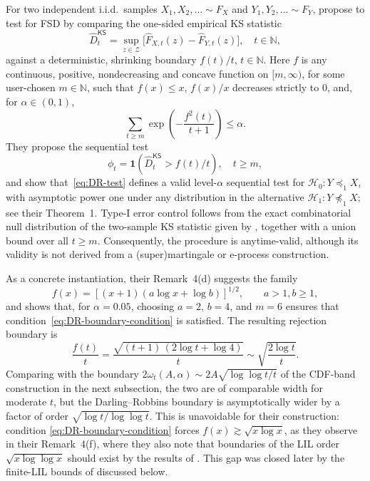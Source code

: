 \documentclass[12pt,twoside]{article}
\theoremstyle{plain}
\theoremstyle{definition}
\theoremstyle{remark}
\newcommand{\N}{\mathbb{N}}
\newcommand{\calH}{\mathcal{H}}
\begin{document}
For two independent i.i.d.\ samples
$X_1, X_2, \dots \sim F_X$ and $Y_1, Y_2, \dots \sim F_Y$, \citet{darling1968some} propose to test for FSD by
comparing the one-sided empirical KS statistic
\begin{equation*}
    \hat{D}^\textsf{KS}_t = \sup_{z \in \mathcal{Z}}
  \big[\widehat{F}_{X,t}(z) - \widehat{F}_{Y,t}(z)\big], \quad t\in \N,
\end{equation*}
against a deterministic, shrinking boundary $f(t)/t$, $t\in \N$. Here $f$ is any
continuous, positive, nondecreasing and concave function on $[m,\infty)$, for
some user-chosen $m \in \mathbb{N}$, such that $f(x) \le x$, $f(x)/x$
decreases strictly to $0$, and, for $\alpha\in (0,1)$,
\begin{equation} \label{eq:DR-boundary-condition}
  \sum_{t \ge m} \exp\left(-\frac{f^2(t)}{t+1}\right) \le \alpha .
\end{equation}
They propose the sequential test
\begin{equation}
  \phi_t = \mathbf{1}\!\left(\hat{D}^\textsf{KS}_t > f(t)/t\right), \quad t \ge m,
  \label{eq:DR-test}
\end{equation}
and show that~\eqref{eq:DR-test} defines a valid level-$\alpha$ sequential test for $\calH_0 : Y \preceq_1 X$, with asymptotic power one under any distribution in the alternative $\calH_1 : Y \not\preceq_1 X$; see their Theorem~1.
Type-I error control follows from the exact combinatorial null distribution of the two-sample KS statistic given by \citet{GnedenkoKorolyuk1951}, together with a union bound over all $t \geq m$. Consequently, the procedure is anytime-valid, although its validity is not derived from a (super)martingale or e-process construction.

As a concrete instantiation, their Remark~4(d) suggests the family
\begin{equation*}
f(x) = [(x+1)(a \log x + \log b)]^{1/2},
\qquad a > 1, b \ge 1,
\end{equation*}
and shows that, for $\alpha = 0.05$, choosing $a = 2$, $b = 4$, and $m = 6$ ensures that condition~\eqref{eq:DR-boundary-condition} is satisfied. The resulting rejection boundary is
\begin{equation*}
     \frac{f(t)}{t}
  = \frac{\sqrt{(t+1)\,(2\log t + \log 4)}}{t}
  \sim \sqrt{\frac{2\log t}{t}} .
\end{equation*}
Comparing with the boundary $2\omega_t(A,\alpha) \sim
2A\sqrt{\log\log t / t}$ of the CDF-band construction in the next subsection, the two are of comparable width for moderate $t$, 
but the Darling--Robbins boundary is asymptotically wider by a factor of order
$\sqrt{\log t / \log\log t}$. This is unavoidable for their construction:
condition \eqref{eq:DR-boundary-condition} forces $f(x) \gtrsim \sqrt{x\log x}$,
as they observe in their Remark~4(f), where they also note that boundaries of
the LIL order $\sqrt{x \log\log x}$ should exist by the results of
\citet{chung1949estimate}. This gap was closed later by the finite-LIL bounds of \citet{howard2022sequential} discussed
below. 
\end{document}
